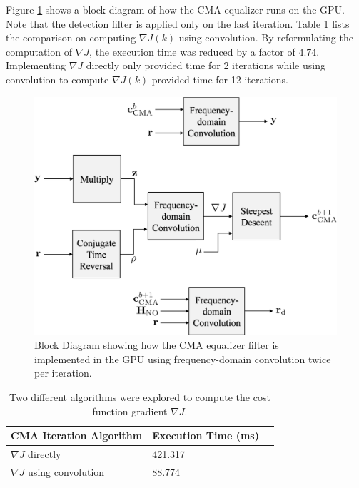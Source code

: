 Figure \ref{fig:blockCMA} shows a block diagram of how the CMA equalizer runs on the GPU.
Note that the detection filter is applied only on the last iteration.
Table \ref{tab:CMAtimingComparison} lists the comparison on computing $\nabla J(k)$ using convolution.
By reformulating the computation of $\nabla J$, the execution time was reduced by a factor of $4.74$.
Implementing $\nabla J$ directly only provided time for 2 iterations while using convolution to compute $\nabla J(k)$ provided time for 12 iterations.
\begin{figure}
	\centering\includegraphics[width=8.34in/100*55]{figures/eq_GPUimplementation/blockCMA.pdf}
	\caption{Block Diagram showing how the CMA equalizer filter is implemented in the GPU using frequency-domain convolution twice per iteration.}
	\label{fig:blockCMA}
\end{figure}
\begin{table}
\caption{Two different algorithms were explored to compute the cost function gradient $\nabla J$.}
\begin{center}
\begin{tabular}{lll}
	\toprule
	CMA	Iteration Algorithm		& Execution Time (ms)	\\ \midrule
	$\nabla J$ directly 		& 421.317				\\
	$\nabla J$ using convolution & 88.774				\\
	\bottomrule
\end{tabular}
\end{center}
\label{tab:CMAtimingComparison}
\end{table}


